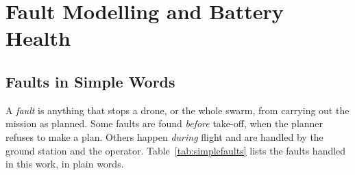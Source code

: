 \documentclass[11pt,a4paper,oneside]{report}
\begin{document}
\chapter{Fault Modelling and Battery Health}\label{ch:faults}

\section{Faults in Simple Words}
A \emph{fault} is anything that stops a drone, or the whole swarm, from carrying out the mission
as planned. Some faults are found \emph{before} take-off, when the planner refuses to make a
plan. Others happen \emph{during} flight and are handled by the ground station and the operator.
Table~\ref{tab:simplefaults} lists the faults handled in this work, in plain words.
\end{document}

